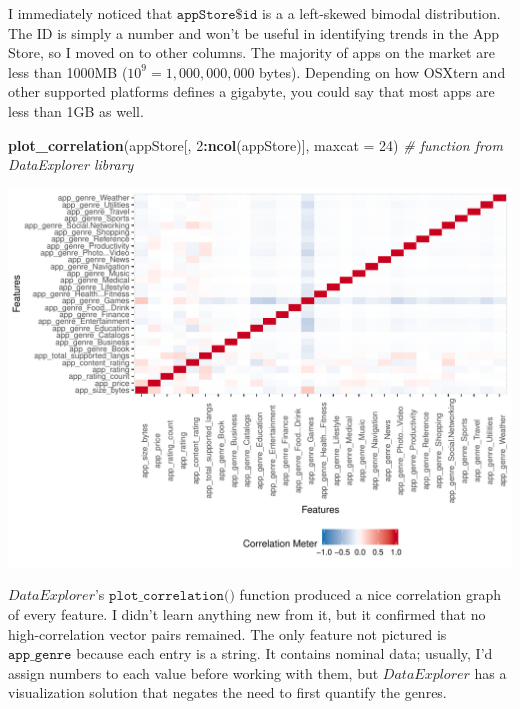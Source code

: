 \documentclass[]{article}
\newenvironment{Shaded}{\begin{snugshade}}{\end{snugshade}}
\newcommand{\CommentTok}[1]{\textcolor[rgb]{0.56,0.35,0.01}{\textit{#1}}}
\newcommand{\DataTypeTok}[1]{\textcolor[rgb]{0.13,0.29,0.53}{#1}}
\newcommand{\DecValTok}[1]{\textcolor[rgb]{0.00,0.00,0.81}{#1}}
\newcommand{\KeywordTok}[1]{\textcolor[rgb]{0.13,0.29,0.53}{\textbf{#1}}}
\newcommand{\NormalTok}[1]{#1}
\newcommand{\OperatorTok}[1]{\textcolor[rgb]{0.81,0.36,0.00}{\textbf{#1}}}
\begin{document}
I immediately noticed that \(\texttt{appStore\$id}\) is a a left-skewed
bimodal distribution. The ID is simply a number and won't be useful in
identifying trends in the App Store, so I moved on to other columns. The
majority of apps on the market are less than 1000MB
(\(10^9 = 1,000,000,000\) bytes). Depending on how OSXtern and other
supported platforms defines a gigabyte, you could say that most apps are
less than 1GB as well.

\begin{Shaded}
\begin{Highlighting}[]
\KeywordTok{plot_correlation}\NormalTok{(appStore[, }\DecValTok{2}\OperatorTok{:}\KeywordTok{ncol}\NormalTok{(appStore)], }\DataTypeTok{maxcat =} \DecValTok{24}\NormalTok{)  }\CommentTok{# function from DataExplorer library}
\end{Highlighting}
\end{Shaded}

\begin{center}\includegraphics{Plots/analysis2-1} \end{center}

\(\textit{DataExplorer}\)'s \(\texttt{plot\_correlation()}\) function
produced a nice correlation graph of every feature. I didn't learn
anything new from it, but it confirmed that no high-correlation vector
pairs remained. The only feature not pictured is \(\texttt{app\_genre}\)
because each entry is a string. It contains nominal data; usually, I'd
assign numbers to each value before working with them, but
\(\textit{DataExplorer}\) has a visualization solution that negates the
need to first quantify the genres.
\end{document}
